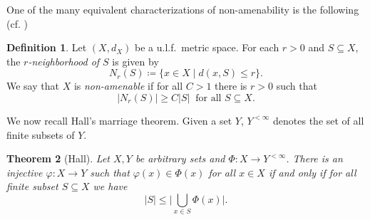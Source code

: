 \documentclass[11pt]{amsart}
\numberwithin{equation}{section}
\newtheorem{theorem}{Theorem}[section]
\theoremstyle{definition}
\newtheorem{definition}[theorem]{Definition}
\theoremstyle{remark}
\numberwithin{equation}{section}
\begin{document}
One of the many equivalent characterizations of non-amenability is the following (cf. \cite[Lemma 2.1]{Whyte1999Duke}) 

\begin{definition}
Let $(X,d_X)$ be a u.l.f.\ metric space. For each $r>0$ and $S\subseteq X$, the \emph{$r$-neighborhood of $S$} is given by 
\[
N_r(S)\coloneqq \{x\in X\mid d(x,S)\le r\}.
\]
We say that $X$ is \emph{non-amenable} if for all $C>1$ there is $r>0$ such that \[|N_r(S)|\ge C |S| \ \text{ for all } S\subseteq X.\]
\end{definition}

We now recall Hall's marriage theorem. Given a set $Y$, $Y^{<\infty}$ denotes the set of all finite subsets of $Y$.

\begin{theorem}[Hall]
Let $X,Y$ be arbitrary sets and $\Phi \colon X \to Y^{<\infty}$. There is an injective $\varphi\colon X\to Y$ such that $\varphi(x)\in \Phi(x)$ for all $x\in X$ if and only if for all finite subset $S\subseteq X$ we have 
\[
|S|\le \Bigg|\bigcup_{x\in S}\Phi(x)\Bigg|.
\]
 \label{ThmHall}
\end{theorem}

\end{document}
